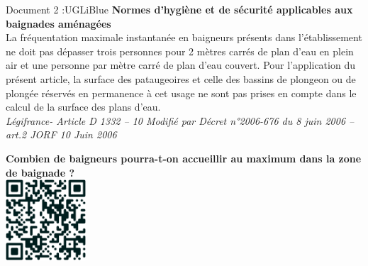 \documentclass[a4paper,12pt,exos]{nsi}
\begin{document}
    \begin{encadrecolore}{Document 2 :}{UGLiBlue}
        \textbf{Normes d’hygiène et de sécurité applicables aux baignades aménagées}\\
        
        La fréquentation maximale instantanée en baigneurs présents dans l’établissement ne doit pas dépasser trois personnes pour 2 mètres carrés de plan d’eau en plein air et une personne par mètre carré de plan d’eau couvert. Pour l’application du présent article, la surface des pataugeoires et celle des bassins de plongeon ou de plongée réservés en permanence à cet usage ne sont pas prises en compte dans le calcul de la surface des plans d’eau.\\[.5em]
        \textit{Légifrance- Article D 1332 – 10 Modifié par Décret n°2006-676 du 8 juin 2006 – art.2 JORF 10 Juin 2006}
    \end{encadrecolore}
    
    \textbf{Combien de baigneurs pourra-t-on accueillir au maximum dans la zone de baignade ?}\\
    
    {\includegraphics[width=3cm]{code-qr.png}}
    
\end{document}
